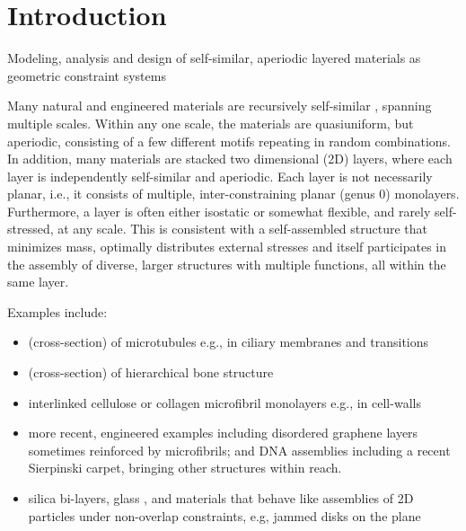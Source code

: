 \section{Introduction}
Modeling, analysis and design of self-similar, aperiodic layered materials as geometric constraint systems
 

Many natural and engineered materials are recursively self-similar \cite{Intro1}, 
spanning multiple scales. Within any one scale, the materials are quasiuniform, but aperiodic, 
consisting of a few different motifs repeating in random combinations.
In addition, many materials are stacked two dimensional (2D) layers, where each layer is independently self-similar and aperiodic.
Each layer is not necessarily planar, i.e., it consists of multiple, inter-constraining planar (genus 0) monolayers. 
Furthermore, a layer is often   either isostatic or somewhat flexible, and rarely self-stressed, at any scale. This is 
consistent with a self-assembled structure that minimizes mass, optimally distributes external stresses and itself 
participates in the assembly of diverse, 
larger structures with multiple functions, all within the same layer.  

Examples include:

\begin{itemize}
    
    \item (cross-section) of microtubules \cite{Necklace1} e.g., in ciliary membranes and transitions \cite{Necklace2}
    
    \item (cross-section) of hierarchical bone structure \cite{XX}
    
    \item interlinked cellulose or collagen microfibril monolayers e.g., in cell-walls \cite{CellWalls1} \cite{CellWalls1}
    
    \item more recent, engineered examples including  disordered graphene layers \cite{Graphene1} \cite{Graphene2} sometimes reinforced 
    by  microfibrils; and DNA assemblies \cite{Microfibrils1} including a recent Sierpinski carpet, bringing other structures 
    \cite{Microfibrils2} within reach.
    
    \item  silica bi-layers, glass \cite{SilicaGlass1} \cite{SilicaGlass2}, and materials that behave like assemblies of 
    2D particles under non-overlap constraints, e.g, jammed 
    disks on the plane \cite{JammedDisk1}

   
\end{itemize}

